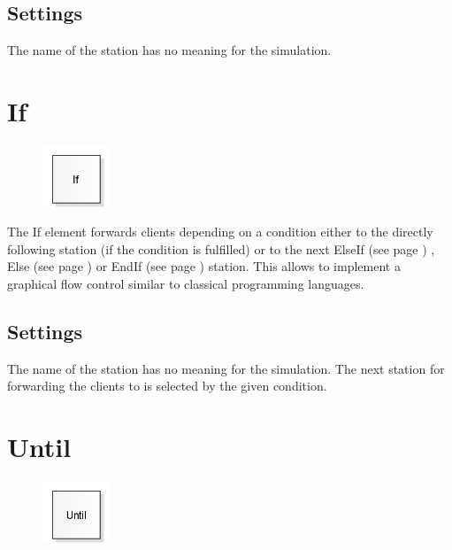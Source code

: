 \subsection*{Settings}

The name of the station has no meaning for the simulation.


\section{If}
\label{ref:ModelElementLogicIf}

\begin{figure}
\vspace{-22pt}
\includegraphics[width=2cm]{imageModelElementLogicIf.png}
\vspace{-22pt}
\end{figure}

The If element forwards clients depending on a condition either to the directly following station
(if the condition is fulfilled) or to the next ElseIf (see page \pageref{ref:ModelElementLogicElseIf}) ,
Else (see page \pageref{ref:ModelElementLogicElse}) or EndIf (see page \pageref{ref:ModelElementLogicEndIf}) 
station. This allows to implement a graphical flow control similar to classical programming
languages.

\subsection*{Settings}

The name of the station has no meaning for the simulation.
The next station for forwarding the clients to is selected by the given condition.


\section{Until}
\label{ref:ModelElementLogicUntil}

\begin{figure}
\vspace{-22pt}
\includegraphics[width=2cm]{imageModelElementLogicUntil.png}
\vspace{-22pt}
\end{figure}

